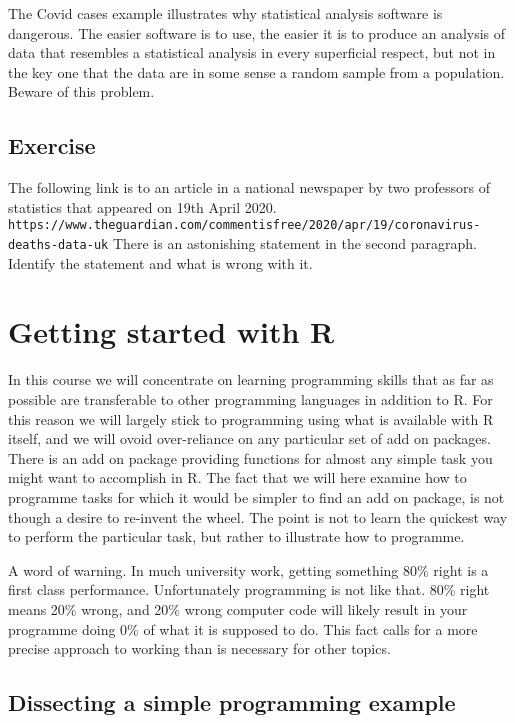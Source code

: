 \documentclass[10pt] {article}
\theoremstyle{definition}
\begin{document}
The Covid cases example illustrates why statistical analysis software is dangerous. The easier software is to use, the easier it is to produce an analysis of data that resembles a statistical analysis in every superficial respect, but not in the key one that the data are in some sense a random sample from a population.  Beware of this problem.         

\subsection*{Exercise}

The following link is to an article in a national newspaper by two professors of statistics that appeared on 19th April 2020.
{\small \verb+https://www.theguardian.com/commentisfree/2020/apr/19/coronavirus-deaths-data-uk+} 
There is an astonishing statement in the second paragraph. Identify the statement and what is wrong with it.


\section{Getting started with R}

In this course we will concentrate on learning programming skills that as far as possible are transferable to other programming languages in addition to R. For this reason we will largely stick to programming using what is available with R itself, and we will ovoid over-reliance on any particular set of add on packages. There is an add on package providing functions for almost any simple task you might want to accomplish in R. The fact that we will here examine how to programme tasks for which it would be simpler to find an add on package, is not though a desire to re-invent the wheel. The point is not to learn the quickest way to perform the particular task, but rather to illustrate how to programme. 

A word of warning. In much university work, getting something 80\% right is a first class performance. Unfortunately programming is not like that. 80\% right means 20\% wrong, and 20\% wrong computer code will likely result in your programme doing 0\% of what it is supposed to do. This fact calls for a more precise approach to working than is necessary for other topics.  

\subsection{Dissecting a simple programming example}
\end{document}
